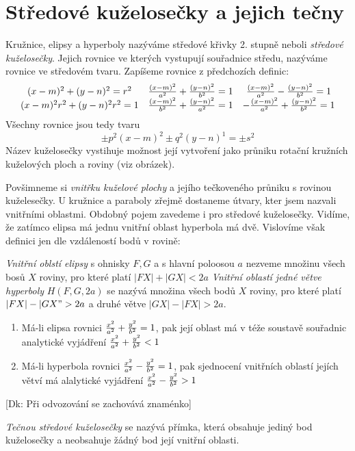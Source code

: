 
\BeginDoc{}
\section{Středové kuželosečky a jejich tečny}
\Def
Kružnice, elipsy a hyperboly nazýváme středové křivky 2. stupně neboli \emph{středové kuželosečky}.
Jejich rovnice ve  kterých vystupují souřadnice středu, nazýváme rovnice ve středovém tvaru.
\Poz
Zapíšeme rovnice z předchozích definic:
$$
\begin{array}{ccc}
	(x-m)^2 + (y-n)^2 = r^2 & \frac{(x-m)^2}{a^2}+\frac{(y-n)^2}{b^2}= 1 & \frac{(x-m)^2}{a^2}-\frac{(y-n)^2}{b^2} = 1 \\
	{(x-m)^2}{r^2} + {(y-n)^2}{r^2} = 1 & \frac{(x-m)^2}{b^2}+\frac{(y-n)^2}{a^2}= 1 & -\frac{(x-m)^2}{a^2}+\frac{(y-n)^2}{b^2} = 1 \\
\end{array}
$$
Všechny rovnice jsou tedy tvaru
$$\pm p^2(x-m)^2 \pm q^2 (y-n)^1 = \pm s^2$$
\Poz
{}
Název kuželosečky vystihuje možnost její vytvoření jako průniku rotační kružních kuželových ploch a roviny (viz obrázek).

Povšimneme si \emph{vnitřku kuželové plochy} a jejího tečkoveného průniku s rovinou kuželesečky.
U kružnice a paraboly zřejmě dostaneme útvary, kter jsem nazvali vnitřními oblastmi.
Obdobný pojem zavedeme i pro středové kuželosečky.
Vidíme, že zatímco elipsa má jednu vnitřní oblast hyperbola má dvě.
Vislovíme však definici jen dle vzdáleností bodů v rovině:

\Def
\emph{Vnitřní oblstí elipsy} s ohnisky $F,G$ a s hlavní poloosou $a$ nezveme množinu všech bosů $X$ roviny, pro které platí $|FX|+|GX| < 2a$
\Def \emph{Vnitřní oblastí jedné větve hyperboly} $H(F,G,2a)$ se nazývá množina všech bodů $X$ roviny, pro které platí $|FX|-|GX" > 2a$ a druhé větve $|GX|-|FX|>2a$.
\V
\begin{enumerate}
	\item Má-li elipsa rovnici $\frac{x^2}{a^2} + \frac{y^2}{b^2} = 1$, pak její oblast má v téže soustavě souřadnic analytické vyjádření $\frac{x^2}{a^2}+\frac{y^2}{b^2} < 1$
	\item Má-li hyperbola rovnici $\frac{x^2}{a^2}-\frac{y^2}{b^2} = 1$, pak sjednocení vnitřních oblastí jejích větví má alalytické vyjádření $\frac{x^2}{a^2}-\frac{y^2}{b^2} > 1$
\end{enumerate}
[Dk: Při odvozování se zachovává znaménko]

\Def
\emph{Tečnou středové kuželosečky} se nazývá přímka, která obsahuje jediný bod kuželosečky a neobsahuje žádný bod její vnitřní oblasti.

